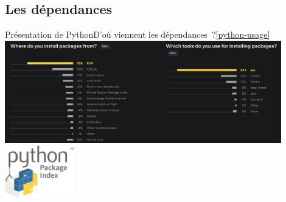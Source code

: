 \documentclass{beamer}
\begin{document}
    \subsection{Les dépendances}\label{subsec:dependances}

    \begin{frame}{Présentation de Python}{D'où viennent les dépendances~?\cref{python-usage}}
        \centering
        \includegraphics[width=12cm]{image/survey-packaging}
        \bigbreak
        \includegraphics[width=3cm]{image/pypi-logo}
    \end{frame}
\end{document}
